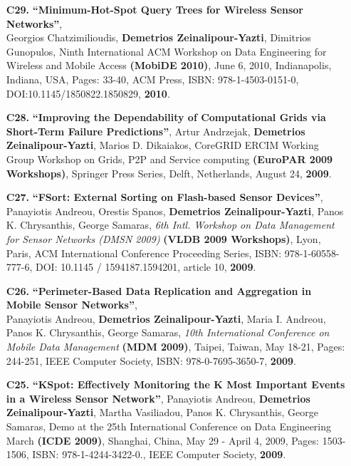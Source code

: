 \documentclass[10pt]{article}
\begin{document}
\begin{enumerate}
\item[{\bf C29.}]
\label{C29}
{\bf ``Minimum-Hot-Spot Query Trees for Wireless Sensor Networks''}, \\
Georgios Chatzimilioudis, {\bf Demetrios Zeinalipour-Yazti}, Dimitrios Gunopulos,
Ninth International ACM Workshop on Data Engineering for Wireless and Mobile Access {\bf (MobiDE 2010)},
June 6, 2010, Indianapolis, Indiana, USA, Pages: 33-40, ACM Press, ISBN: 978-1-4503-0151-0, 
DOI:10.1145/1850822.1850829, {\bf 2010}.

\item[{\bf C28.}]
\label{C28}
{\bf ``Improving the Dependability of Computational Grids via Short-Term Failure Predictions''}, 
Artur Andrzejak, {\bf Demetrios Zeinalipour-Yazti}, Marios D. Dikaiakos,
CoreGRID ERCIM Working Group Workshop on Grids, P2P and Service computing
{\bf (EuroPAR 2009 Workshops)}, Springer Press Series, Delft, Netherlands, August 24, {\bf 2009}.  

\item[{\bf C27.}]
\label{C27}
{\bf ``FSort: External Sorting on Flash-based Sensor Devices''}, \\ 
Panayiotis Andreou, Orestis Spanos, {\bf Demetrios Zeinalipour-Yazti}, Panos K. Chrysanthis, George Samaras,  
{\em 6th Intl. Workshop on Data Management for Sensor Networks (DMSN 2009)}
{\bf (VLDB 2009 Workshops)}, Lyon, Paris, ACM International Conference Proceeding Series, ISBN: 978-1-60558-777-6, DOI: 10.1145 / 1594187.1594201, article 10, {\bf 2009}.  

\item[{\bf C26.}]
\label{C26}
{\bf ``Perimeter-Based Data Replication and Aggregation in Mobile Sensor Networks''}, \\
Panayiotis Andreou, {\bf Demetrios Zeinalipour-Yazti}, Maria I. Andreou, Panos K. Chrysanthis, George Samaras,  
{\em 10th International Conference on Mobile Data Management} {\bf (MDM 2009)},
Taipei, Taiwan, May 18-21, Pages: 244-251, IEEE Computer Society, ISBN: 978-0-7695-3650-7, {\bf 2009}.

\item[{\bf C25.}] 
\label{C25}
{\bf ``KSpot: Effectively Monitoring the K Most Important Events in a Wireless Sensor Network''}, 
Panayiotis Andreou, {\bf Demetrios Zeinalipour-Yazti}, Martha Vasiliadou, Panos K. Chrysanthis, George Samaras,  
Demo at the 25th International Conference on Data Engineering March {\bf (ICDE 2009)}, Shanghai, China, May 29 - April 4, 2009, Pages: 1503-1506, ISBN: 978-1-4244-3422-0., IEEE Computer Society, {\bf 2009}.


\end{enumerate}
\end{document}
